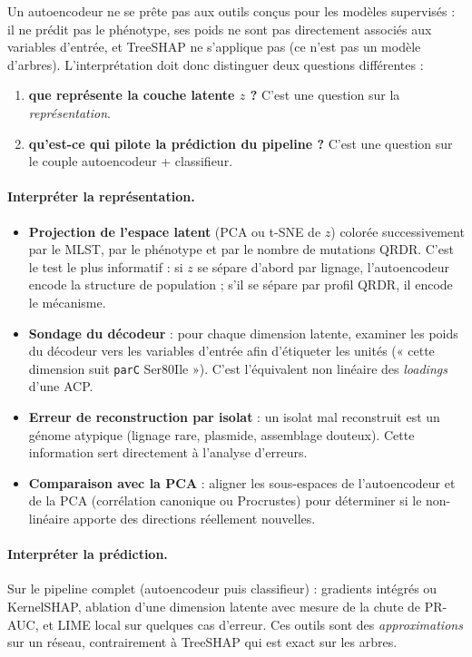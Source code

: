 \documentclass[11pt,a4paper]{article}
\begin{document}
Un autoencodeur ne se prête pas aux outils conçus pour les modèles supervisés : il ne prédit pas le phénotype, ses poids ne sont pas directement associés aux variables d'entrée, et TreeSHAP ne s'applique pas (ce n'est pas un modèle d'arbres). L'interprétation doit donc distinguer deux questions différentes :
\begin{enumerate}[leftmargin=1.4em]
    \item \textbf{que représente la couche latente \(z\) ?} C'est une question sur la \emph{représentation}.
    \item \textbf{qu'est-ce qui pilote la prédiction du pipeline ?} C'est une question sur le couple autoencodeur + classifieur.
\end{enumerate}

\paragraph{Interpréter la représentation.}
\begin{itemize}[leftmargin=1.2em]
    \item \textbf{Projection de l'espace latent} (PCA ou t-SNE de \(z\)) colorée successivement par le MLST, par le phénotype et par le nombre de mutations QRDR. C'est le test le plus informatif : si \(z\) se sépare d'abord par lignage, l'autoencodeur encode la structure de population ; s'il se sépare par profil QRDR, il encode le mécanisme.
    \item \textbf{Sondage du décodeur} : pour chaque dimension latente, examiner les poids du décodeur vers les variables d'entrée afin d'étiqueter les unités (« cette dimension suit \texttt{parC} Ser80Ile »). C'est l'équivalent non linéaire des \emph{loadings} d'une ACP.
    \item \textbf{Erreur de reconstruction par isolat} : un isolat mal reconstruit est un génome atypique (lignage rare, plasmide, assemblage douteux). Cette information sert directement à l'analyse d'erreurs.
    \item \textbf{Comparaison avec la PCA} : aligner les sous-espaces de l'autoencodeur et de la PCA (corrélation canonique ou Procrustes) pour déterminer si le non-linéaire apporte des directions réellement nouvelles.
\end{itemize}

\paragraph{Interpréter la prédiction.}
Sur le pipeline complet (autoencodeur puis classifieur) : gradients intégrés ou KernelSHAP, ablation d'une dimension latente avec mesure de la chute de PR-AUC, et LIME local sur quelques cas d'erreur. Ces outils sont des \emph{approximations} sur un réseau, contrairement à TreeSHAP qui est exact sur les arbres.
\end{document}
